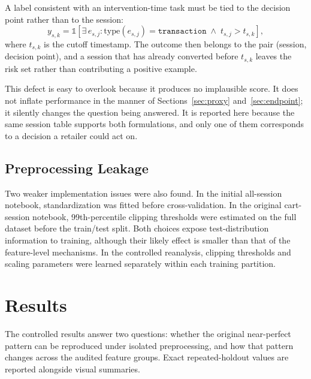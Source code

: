 \documentclass[conference, letterpaper]{IEEEtran}
\begin{document}
A label consistent with an intervention-time task must be tied to the decision point rather than to the session:
\begin{equation}
y_{s,k} = \mathbb{1}[\exists\, e_{s,j} : \mathrm{type}(e_{s,j}) = \texttt{transaction} \;\wedge\; t_{s,j} > t_{s,k}],
\label{eq:cutlabel}
\end{equation}
where $t_{s,k}$ is the cutoff timestamp. The outcome then belongs to the pair (session, decision point), and a session that has already converted before $t_{s,k}$ leaves the risk set rather than contributing a positive example.

This defect is easy to overlook because it produces no implausible score. It does not inflate performance in the manner of Sections~\ref{sec:proxy} and~\ref{sec:endpoint}; it silently changes the question being answered. It is reported here because the same session table supports both formulations, and only one of them corresponds to a decision a retailer could act on.

\subsection{Preprocessing Leakage}
Two weaker implementation issues were also found. In the initial all-session notebook, standardization was fitted before cross-validation. In the original cart-session notebook, 99th-percentile clipping thresholds were estimated on the full dataset before the train/test split. Both choices expose test-distribution information to training, although their likely effect is smaller than that of the feature-level mechanisms. In the controlled reanalysis, clipping thresholds and scaling parameters were learned separately within each training partition.

\section{Results}
The controlled results answer two questions: whether the original near-perfect pattern can be reproduced under isolated preprocessing, and how that pattern changes across the audited feature groups. Exact repeated-holdout values are reported alongside visual summaries.
\end{document}
